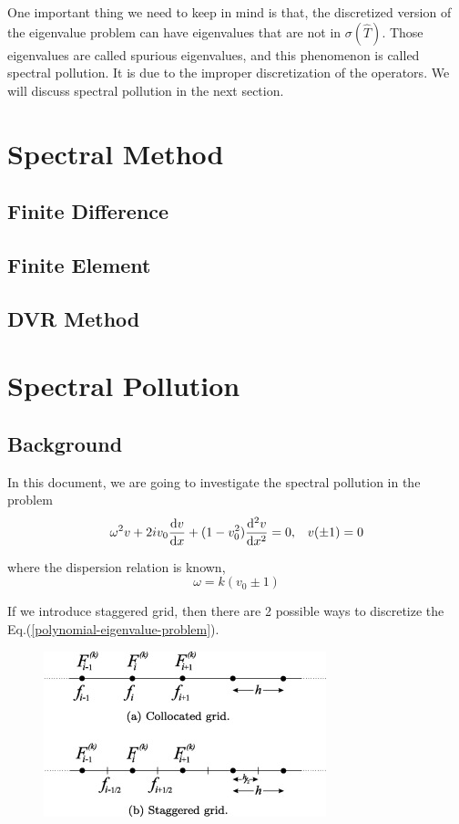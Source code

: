 One important thing we need to keep in mind is that, the discretized version of the eigenvalue problem can have eigenvalues that are not in $\sigma(\hat{T})$. Those eigenvalues are called spurious eigenvalues, and this phenomenon is called spectral pollution. It is due to the improper discretization of the operators. We will discuss spectral pollution in the next section.

\section{Spectral Method}
\subsection{Finite Difference}
\subsection{Finite Element}
\subsection{DVR Method}

\section{Spectral Pollution}
\subsection{Background}
In this document, we are going to investigate the spectral pollution in the problem
\begin{equation} \label{polynomial-eigenvalue-problem}
	\omega^2v + 2iv_0\dv{v}{x} + (1-v_0^2)\dv[2]{v}{x} = 0, \;\;\; v(\pm 1) = 0
\end{equation}

where the dispersion relation is known,
\begin{equation} \label{dispersion-relation}
	\omega = k(v_0 \pm 1) 
\end{equation}

If we introduce staggered grid, then there are 2 possible ways to discretize the Eq.(\ref{polynomial-eigenvalue-problem}).

\begin{figure}[H]
	\centering
	\includegraphics[width=0.7\linewidth]{img/spectral_theory/staggered_grid.jpg}
\end{figure}

